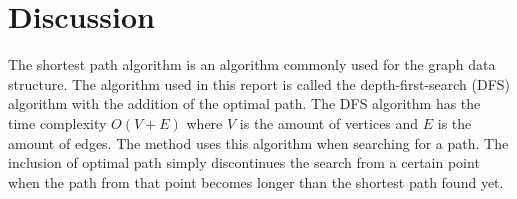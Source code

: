 \documentclass[a4paper,11pt]{article}
\begin{document}
\section*{Discussion}

The shortest path algorithm is an algorithm commonly used for the graph
data structure. The algorithm used in this report is called the 
depth-first-search (DFS) algorithm with the addition of the optimal path.
The DFS algorithm has the time complexity $O(V + E)$ where $V$ is the 
amount of vertices and $E$ is the amount of edges. The method uses this
algorithm when searching for a path. The inclusion of optimal path 
simply discontinues the search from a certain point when the path from 
that point becomes longer than the shortest path found yet.
\end{document}
